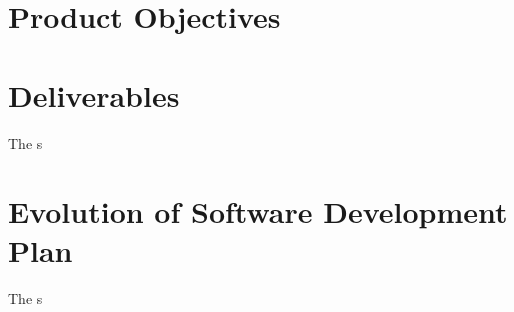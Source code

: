 
\section{Product Objectives}



\section{Deliverables}

The s


\section{Evolution of Software Development Plan}

The s